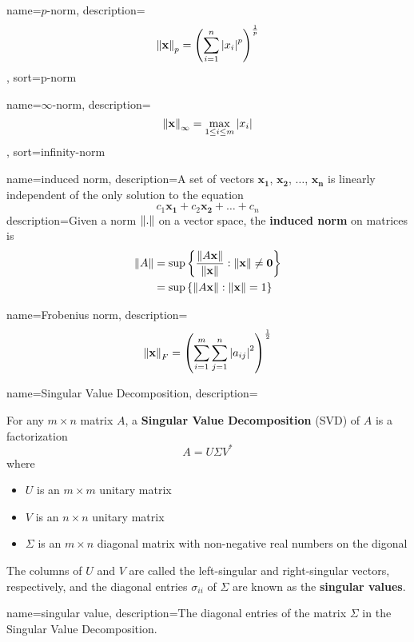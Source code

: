 {
        name={\ensuremath{p}-norm},
        description={\[\left\lVert\mathbf{x}\right\rVert_p=\left(\sum_{i=1}^n\left|x_i\right|^p\right)^{\frac{1}{p}}\]
        },
        sort=p-norm
}

{
        name={\ensuremath{\infty}-norm},
        description={\[\left\lVert\mathbf{x}\right\rVert_{\infty}=\max_{1\leq i\leq m}\left|x_i\right|\]
                },
        sort=infinity-norm
}

{
        name=induced norm,
        description={A set of vectors \(\mathbf{x_1}\), \(\mathbf{x_2}\), \(\hdots\), \(\mathbf{x_n}\) is linearly independent of the only solution to the equation \[c_1\mathbf{x_1}+c_2\mathbf{x_2}+\hdots+c_n\]}
        description={Given a norm \(\left\lVert.\right\rVert\) on a vector space, the \textbf{induced norm} on matrices is
        \begin{align*}\left\lVert A\right\rVert
                & =\sup\left\{\frac{\left\lVert A\mathbf{x}\right\rVert}{\left\lVert\mathbf{x}\right\rVert}:\left\lVert\mathbf{x}\right\rVert\neq\mathbf{0}\right\} \\
                & =\sup\left\{\left\lVert A\mathbf{x}\right\rVert:\left\lVert\mathbf{x}\right\rVert=1\right\}
        \end{align*}}
}

{
        name=Frobenius norm,
        description={\[\left\lVert\mathbf{x}\right\rVert_F=\left(\sum_{i=1}^m\sum_{j=1}^n\left|a_{ij}\right|^2\right)^{\frac{1}{2}}\]}
}

{
        name=Singular Value Decomposition,
        description={For any \(m\times n\) matrix \(A\), a \textbf{Singular Value Decomposition} (SVD) of \(A\) is a factorization \[A=U\Sigma V^*\] where
                        \begin{itemize}
                                \item \(U\) is an \(m\times m\) unitary matrix
                                \item \(V\) is an \(n\times n\) unitary matrix
                                \item \(\Sigma\) is an \(m\times n\) diagonal matrix with non-negative real numbers on the digonal
                        \end{itemize}
                        The columns of \(U\) and \(V\) are called the left-singular and right-singular vectors, respectively, and the diagonal entries \(\sigma_{ii}\) of \(\Sigma\) are known as the \textbf{singular values}.}
}

{
        name=singular value,
        description={The diagonal entries of the matrix \(\Sigma\) in the Singular Value Decomposition.}
}

